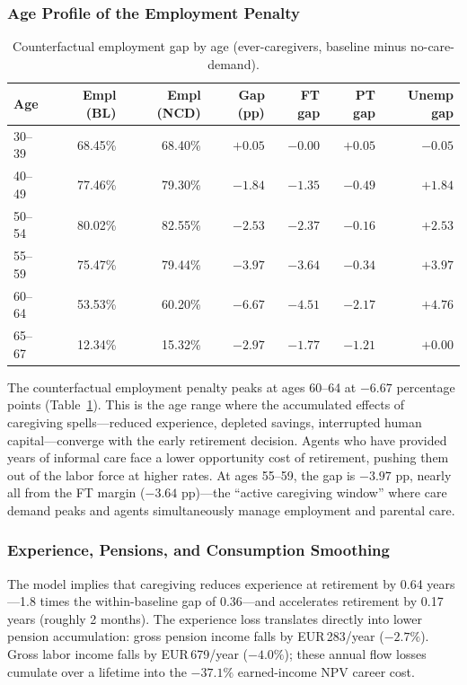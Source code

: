 \subsubsection{Age Profile of the Employment Penalty}

\begin{table}[htbp]
  \centering
  \caption{Counterfactual employment gap by age (ever-caregivers, baseline minus no-care-demand).}
  \label{tab:age_profile_ncd}
  \small
  \begin{tabular}{lrrrrrr}
    \toprule
    Age & Empl (BL) & Empl (NCD) & Gap (pp) & FT gap & PT gap & Unemp gap \\
    \midrule
    30--39 & 68.45\% & 68.40\% & $+0.05$ & $-0.00$ & $+0.05$ & $-0.05$ \\
    40--49 & 77.46\% & 79.30\% & $-1.84$ & $-1.35$ & $-0.49$ & $+1.84$ \\
    50--54 & 80.02\% & 82.55\% & $-2.53$ & $-2.37$ & $-0.16$ & $+2.53$ \\
    55--59 & 75.47\% & 79.44\% & $-3.97$ & $-3.64$ & $-0.34$ & $+3.97$ \\
    60--64 & 53.53\% & 60.20\% & $\mathbf{-6.67}$ & $-4.51$ & $-2.17$ & $+4.76$ \\
    65--67 & 12.34\% & 15.32\% & $-2.97$ & $-1.77$ & $-1.21$ & $+0.00$ \\
    \bottomrule
  \end{tabular}
\end{table}

The counterfactual employment penalty peaks at ages 60--64 at $-6.67$ percentage points (Table~\ref{tab:age_profile_ncd}). This is the age range where the accumulated effects of caregiving spells---reduced experience, depleted savings, interrupted human capital---converge with the early retirement decision. Agents who have provided years of informal care face a lower opportunity cost of retirement, pushing them out of the labor force at higher rates. At ages 55--59, the gap is $-3.97$ pp, nearly all from the FT margin ($-3.64$ pp)---the ``active caregiving window'' where care demand peaks and agents simultaneously manage employment and parental care.

\subsubsection{Experience, Pensions, and Consumption Smoothing}

The model implies that caregiving reduces experience at retirement by 0.64 years---1.8 times the within-baseline gap of 0.36---and accelerates retirement by 0.17 years (roughly 2 months). The experience loss translates directly into lower pension accumulation: gross pension income falls by EUR\,283/year ($-2.7\%$). Gross labor income falls by EUR\,679/year ($-4.0\%$); these annual flow losses cumulate over a lifetime into the $-37.1\%$ earned-income NPV career cost.

